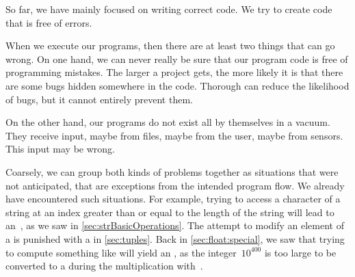 %
\label{sec:exceptions}%
%
So far, we have mainly focused on writing correct code.
We try to create code that is free of errors.

When we execute our programs, then there are at least two things that can go wrong.
On one hand, we can never really be sure that our program code is free of programming mistakes.
The larger a project gets, the more likely it is that there are some bugs hidden somewhere in the code.
Thorough  can reduce the likelihood of bugs, but it cannot entirely prevent them.

On the other hand, our programs do not exist all by themselves in a vacuum.
They receive input, maybe from files, maybe from the user, maybe from sensors.
This input may be wrong.

Coarsely, we can group both kinds of problems together as situations that were not anticipated, that are exceptions from the intended program flow.
We already have encountered such situations.
For example, trying to access a character of a string at an index greater than or equal to the length of the string will lead to an~, as we saw in \cref{sec:strBasicOperations}.
The attempt to modify an element of a  is punished with a  in \cref{sec:tuples}.
Back in \cref{sec:float:special}, we saw that trying to compute something like  will yield an , as the integer~$10^{400}$ is too large to be converted to a  during the multiplication with~.


